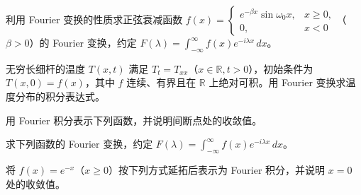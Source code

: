 \noindent\begin{minipage}{\textwidth}
利用 Fourier 变换的性质求正弦衰减函数 $f(x)=\begin{cases}e^{-\beta x}\sin\omega_0x,&x\ge0,\\0,&x<0\end{cases}$（$\beta>0$）的 Fourier 变换，约定 $F(\lambda)=\int_{-\infty}^{\infty}f(x)e^{-i\lambda x}\,dx$。
\end{minipage}\par\vfill
\noindent\begin{minipage}{\textwidth}
无穷长细杆的温度 $T(x,t)$ 满足 $T_t=T_{xx}$（$x\in\mathbb R,t>0$），初始条件为 $T(x,0)=f(x)$，其中 $f$ 连续、有界且在 $\mathbb R$ 上绝对可积。用 Fourier 变换求温度分布的积分表达式。
\end{minipage}\par\vfill
\newpage
\noindent\begin{minipage}{\textwidth}
用 Fourier 积分表示下列函数，并说明间断点处的收敛值。
\end{minipage}\par\vfill
\noindent\begin{minipage}{\textwidth}
求下列函数的 Fourier 变换，约定 $F(\lambda)=\int_{-\infty}^{\infty}f(x)e^{-i\lambda x}\,dx$。
\end{minipage}\par\vfill
\noindent\begin{minipage}{\textwidth}
将 $f(x)=e^{-x}$（$x\ge0$）按下列方式延拓后表示为 Fourier 积分，并说明 $x=0$ 处的收敛值。
\end{minipage}\par\vfill
